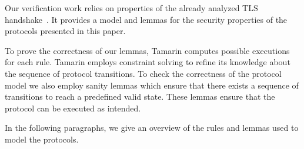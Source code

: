  Our verification work relies on properties of the already analyzed TLS handshake~\cite{tamarin_tls_proof}. It provides a model and lemmas for the security properties of the protocols presented in this paper.

To prove the correctness of our lemmas, Tamarin computes possible executions for each rule. Tamarin employs constraint solving to refine its knowledge about the sequence of protocol transitions. To check the correctness of the protocol model we also employ sanity lemmas which ensure that there exists a sequence of transitions to reach a predefined valid state. These lemmas ensure that the protocol can be executed as intended. 

In the following paragraphs, we give an overview of the rules and lemmas used to model the \projecttitle{} protocols.

